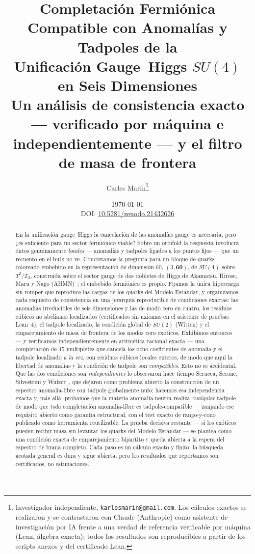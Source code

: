 \documentclass[11pt,a4paper]{article}
\title{\textbf{Completaci\'on Fermi\'onica Compatible con Anomal\'ias y Tadpoles de la\\
Unificaci\'on Gauge--Higgs $SU(4)$ en Seis Dimensiones}\\[4pt]
\large\textnormal{Un an\'alisis de consistencia exacto --- verificado por m\'aquina e independientemente --- y el filtro de masa de frontera}}
\author{Carles Mar\'in\thanks{Investigador independiente, \texttt{karlesmarin@gmail.com}.
Los c\'alculos exactos se realizaron y se contrastaron con Claude (Anthropic) como
asistente de investigaci\'on por IA frente a una verdad de referencia verificable por
m\'aquina (Lean, \'algebra exacta); todos los resultados son
reproducibles a partir de los scripts anexos y del certificado Lean.}}
\date{\today\\[2pt]\small DOI: \href{https://doi.org/10.5281/zenodo.21432626}{10.5281/zenodo.21432626}}
\begin{document}
\maketitle

\begin{abstract}
\noindent
En la unificaci\'on gauge--Higgs la cancelaci\'on de las anomal\'ias gauge es necesaria,
pero ¿es suficiente para un sector fermi\'onico viable? Sobre un orbifold la respuesta
involucra datos genuinamente \emph{locales} --- anomal\'ias y tadpoles ligados a los
puntos fijos --- que un recuento en el bulk no ve. Concretamos la pregunta para un
bloque de quarks coloreado embebido en la representaci\'on de dimensi\'on $60$,
$(3,\mathbf{60})$, de $SU(4)$ sobre $T^2/\mathbb{Z}_2$, construida sobre el sector gauge
de dos dobletes de Higgs de Akamatsu, Hirose, Maru y Nago (AHMN)~\cite{AHMN}; el
embebido fermi\'onico es propio. Fijamos la \'unica hipercarga sin romper que reproduce
las cargas de los quarks del Modelo Est\'andar, y organizamos cada requisito de
consistencia en una jerarqu\'ia reproducible de condiciones exactas: las anomal\'ias
irreducibles de seis dimensiones y las de modo cero en cuatro, los residuos c\'ubicos no
abelianos localizados (certificados sin axiomas en el asistente de pruebas Lean~4), el
tadpole localizado, la condici\'on global de $SU(2)$ (Witten) y el emparejamiento de
masa de frontera de los modos cero ex\'oticos. Exhibimos entonces --- y verificamos
independientemente en aritm\'etica racional exacta --- una completaci\'on de $45$
multipletes que cancela los ocho coeficientes de anomal\'ia y el tadpole localizado
\emph{a la vez}, con residuos c\'ubicos locales enteros, de modo que aqu\'i la libertad
de anomal\'ias y la condici\'on de tadpole son \emph{compatibles}. Esto no es accidental.
Que las dos condiciones son \emph{independientes} lo observaron hace tiempo Scrucca,
Serone, Silvestrini y Wulzer~\cite{SSSW}, que dejaron como problema abierto la
construcci\'on de un espectro anomal\'ia-libre con tadpole globalmente nulo; hacemos esa
independencia exacta y, m\'as all\'a, probamos que la materia anomal\'ia-neutra realiza
\emph{cualquier} tadpole, de modo que \emph{toda} completaci\'on anomal\'ia-libre es
tadpole-compatible --- zanjando ese requisito abierto como garant\'ia estructural, con el
test exacto de rango-y-cono publicado como herramienta reutilizable. La prueba decisiva
restante --- si los ex\'oticos pueden recibir masa sin levantar los quarks del Modelo
Est\'andar --- se plantea como una condici\'on exacta de emparejamiento bipartito y queda
abierta a la espera del espectro de brana completo. Cada paso es un c\'alculo exacto y
finito; la b\'usqueda acotada general es dura y sigue abierta, pero los resultados que
reportamos son certificados, no estimaciones.
\end{abstract}
\end{document}
